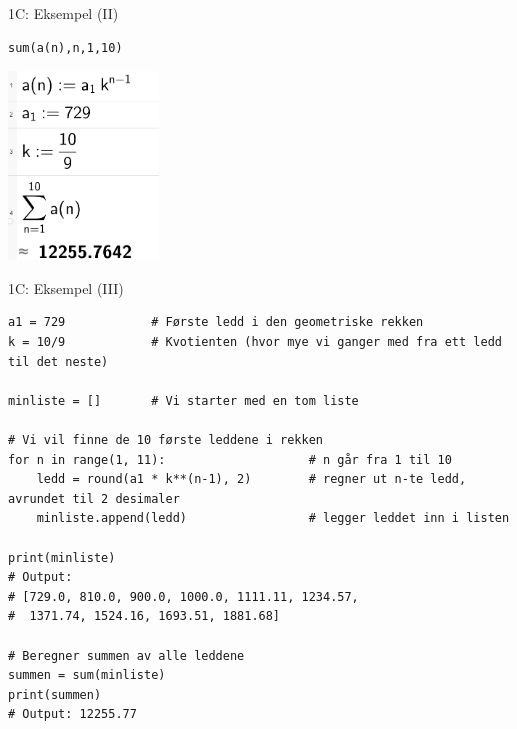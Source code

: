 \greenheader
\begin{frame}[fragile]{1C: Eksempel (II)}
\begin{center}
\Large
\begin{verbatim}
sum(a(n),n,1,10)
\end{verbatim}
\end{center}

\begin{center}
\includegraphics[width=0.3\textwidth]{R2K1C-2.png}
\end{center}
\end{frame}


\greenheader
\begin{frame}[fragile]{1C: Eksempel (III)}
\begin{verbatim}
a1 = 729            # Første ledd i den geometriske rekken
k = 10/9            # Kvotienten (hvor mye vi ganger med fra ett ledd til det neste)

minliste = []       # Vi starter med en tom liste

# Vi vil finne de 10 første leddene i rekken
for n in range(1, 11):                    # n går fra 1 til 10
    ledd = round(a1 * k**(n-1), 2)        # regner ut n-te ledd, avrundet til 2 desimaler
    minliste.append(ledd)                 # legger leddet inn i listen

print(minliste)
# Output:  
# [729.0, 810.0, 900.0, 1000.0, 1111.11, 1234.57,
#  1371.74, 1524.16, 1693.51, 1881.68]

# Beregner summen av alle leddene
summen = sum(minliste)
print(summen)
# Output: 12255.77
\end{verbatim}
\end{frame}

